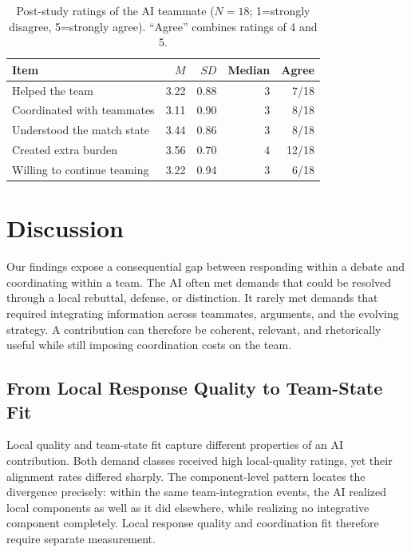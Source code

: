 \documentclass[manuscript,review,anonymous]{acmart}
\begin{document}
\begin{table}[tbp]
\centering
\caption{Post-study ratings of the AI teammate ($N=18$; 1=strongly disagree, 5=strongly agree). ``Agree'' combines ratings of 4 and 5.}
\label{tab:questionnaire-results}
\small
\begin{tabular}{lrrrr}
\toprule
\textbf{Item} & \textbf{$M$} & \textbf{$SD$} & \textbf{Median} & \textbf{Agree} \\
\midrule
Helped the team & 3.22 & 0.88 & 3 & 7/18 \\
Coordinated with teammates & 3.11 & 0.90 & 3 & 8/18 \\
Understood the match state & 3.44 & 0.86 & 3 & 8/18 \\
Created extra burden & 3.56 & 0.70 & 4 & 12/18 \\
Willing to continue teaming & 3.22 & 0.94 & 3 & 6/18 \\
\bottomrule
\end{tabular}
\end{table}

\section{Discussion}

Our findings expose a consequential gap between responding within a debate and coordinating within a team. The AI often met demands that could be resolved through a local rebuttal, defense, or distinction. It rarely met demands that required integrating information across teammates, arguments, and the evolving strategy. A contribution can therefore be coherent, relevant, and rhetorically useful while still imposing coordination costs on the team.

\subsection{From Local Response Quality to Team-State Fit}

Local quality and team-state fit capture different properties of an AI contribution. Both demand classes received high local-quality ratings, yet their alignment rates differed sharply. The component-level pattern locates the divergence precisely: within the same team-integration events, the AI realized local components as well as it did elsewhere, while realizing no integrative component completely. Local response quality and coordination fit therefore require separate measurement.
\end{document}
